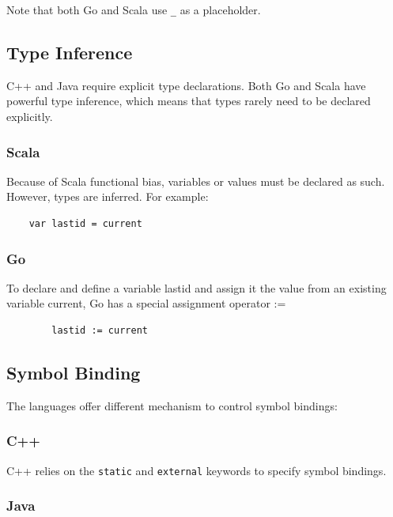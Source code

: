 Note that both Go and Scala use {\tt \_} as a placeholder.

\subsection{Type Inference}

C++ and Java require explicit type declarations.
Both Go and Scala have powerful type inference, which means that types
rarely need to be declared explicitly.

\subsubsection{Scala}

Because of Scala functional bias, variables or values must be declared
as such. However, types are inferred. For example:

\begin{footnotesize}
\begin{verbatim}
    var lastid = current
\end{verbatim}
\end{footnotesize}

\subsubsection{Go}

To declare and define a variable lastid and assign it the value from
an existing variable current, Go has a special assignment operator :=

\begin{footnotesize}
\begin{verbatim}
        lastid := current
\end{verbatim}
\end{footnotesize}

\subsection{Symbol Binding}

The languages offer different mechanism to control symbol bindings:

\subsubsection{C++}

C++ relies on the {\tt static} and {\tt external} keywords to specify symbol
bindings.

\subsubsection{Java}


